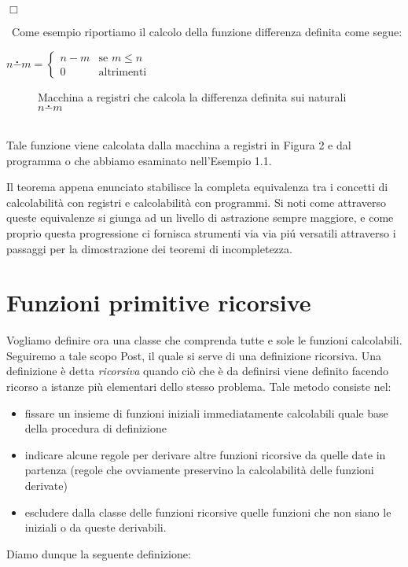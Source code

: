  $\Box$\\
\begin{esempio}[Differenza]
\ Come esempio riportiamo il calcolo della funzione differenza
definita come segue:\\
\begin{center}
$n \stackrel{\centerdot}{-} m= \left\{ \begin{array}{ll} n-m &
    \textrm{se } m \leq n\\ 0 & \textrm{altrimenti}
\end{array} \right.$
\end{center} 

\begin{figure}[h]
\hspace{0cm} 
\caption{Macchina a registri che calcola la differenza definita sui
  naturali $n \stackrel{\centerdot}{-} m$}
\end{figure}
	
\ \\ Tale funzione viene calcolata dalla macchina a registri in Figura
2 e dal programma o che abbiamo esaminato nell'Esempio 1.1.
\end{esempio}
	
	
Il teorema appena enunciato stabilisce la completa equivalenza tra i
concetti di calcolabilità con registri e calcolabilità con
programmi. Si noti come attraverso queste equivalenze si giunga ad un
livello di astrazione sempre maggiore, e come proprio questa
progressione ci fornisca strumenti via via pi\'u versatili attraverso
i passaggi per la dimostrazione dei teoremi di incompletezza.
				

\section{Funzioni primitive ricorsive}
Vogliamo definire ora una classe che comprenda tutte e sole le
funzioni calcolabili. Seguiremo a tale scopo Post, il quale si serve
di una definizione ricorsiva. Una definizione \`e detta
\emph{ricorsiva} quando ci\`o che \`e da definirsi viene definito
facendo ricorso a istanze pi\`u elementari dello stesso problema.
Tale metodo consiste nel:
\begin{itemize}
 \item fissare un insieme di funzioni iniziali immediatamente
   calcolabili quale base della procedura di definizione
 \item indicare alcune regole per derivare altre funzioni ricorsive da
   quelle date in partenza (regole che ovviamente preservino la
   calcolabilità delle funzioni derivate)
 \item escludere dalla classe delle funzioni ricorsive quelle funzioni
   che non siano le iniziali o da queste derivabili.
\end{itemize}
Diamo dunque la seguente definizione:

